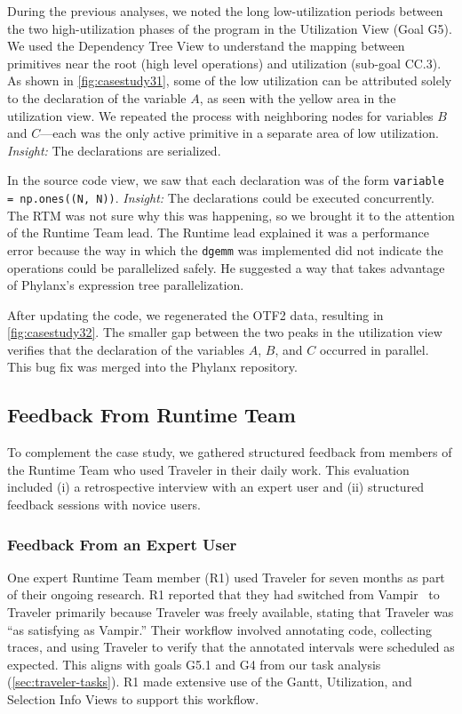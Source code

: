 \begin{refsection}
During the previous analyses, we noted the long low-utilization periods between the two high-utilization phases of the program in the Utilization View (Goal G5). We used the Dependency Tree View to understand the mapping between primitives near the root (high level operations) and utilization (sub-goal CC.3). As shown in \autoref{fig:casestudy31}, some of the low utilization can be attributed solely to the declaration of the variable $A$, as seen with the yellow area in the utilization view. We repeated the process with neighboring nodes for variables $B$ and $C$---each was the only active primitive in a separate area of low utilization. {\em Insight:} The declarations are serialized.

In the source code view, we saw that each declaration was of the form \texttt{variable = np.ones((N, N))}. {\em Insight:} The declarations could be executed concurrently. The RTM was not sure why this was happening, so we brought it to the attention of the Runtime Team lead. The Runtime lead explained it was a performance error because the way in which the \texttt{dgemm} was implemented did not indicate the operations could be parallelized safely. He suggested a way that takes advantage of Phylanx's expression tree parallelization.  

After updating the code, we regenerated the OTF2 data, resulting in \autoref{fig:casestudy32}. The smaller gap between the two peaks in the utilization view verifies that the declaration of the variables $A$, $B$, and $C$ occurred in parallel. This bug fix was merged into the Phylanx repository.

\subsection{Feedback From Runtime Team}
\label{subsec:runtime_feedback}

To complement the case study, we gathered structured feedback from members of the Runtime Team who used Traveler in their daily work. This evaluation included (i) a retrospective interview with an expert user and (ii) structured feedback sessions with novice users.

\subsubsection{Feedback From an Expert User}

One expert Runtime Team member (R1) used Traveler for seven months as part of their ongoing research. R1 reported that they had switched from Vampir~\cite{nagel1996vampir} to Traveler primarily because Traveler was freely available, stating that Traveler was ``as satisfying as Vampir.'' Their workflow involved annotating code, collecting traces, and using Traveler to verify that the annotated intervals were scheduled as expected. This aligns with goals G5.1 and G4 from our task analysis (\autoref{sec:traveler-tasks}). R1 made extensive use of the Gantt, Utilization, and Selection Info Views to support this workflow.


\end{refsection}
